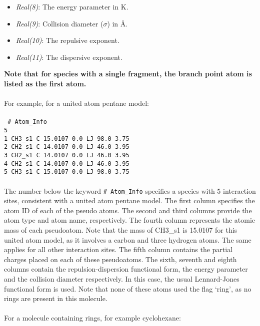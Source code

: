 \begin{itemize} 
\item {\it Real(8)}: The energy parameter in K.
%
\item {\it Real(9)}: Collision diameter ($\sigma$)  in \AA.
%
\item {\it Real(10)}: The repulsive exponent.
%
\item {\it Real(11)}: The dispersive exponent.
\end{itemize} 
%
%
{\bf Note that for species with a single fragment, the branch point atom
 is listed as the first atom.} \\ \\
%
For example, for a united atom pentane model: \\ \\
%
\texttt{
\# Atom\_Info\\
5\\
1    CH3\_s1    C    15.0107    0.0    LJ    98.0    3.75\\
2    CH2\_s1    C    14.0107    0.0    LJ    46.0    3.95\\
3    CH2\_s1    C    14.0107    0.0    LJ    46.0    3.95\\
4    CH2\_s1    C    14.0107    0.0    LJ    46.0    3.95\\
5    CH3\_s1    C    15.0107    0.0    LJ    98.0    3.75\\
} \\ 
%
The number below the keyword \texttt{\# Atom\_Info} specifies a species with 5 interaction sites, consistent with a united atom pentane model. 
The first column specifies the atom ID of each of the pseudo atoms.
The second and third columns provide the atom type and atom name, respectively.
The fourth column represents the atomic mass of each pseudoatom. Note that the mass of
CH3\_s1 is 15.0107 for this united atom model, as it involves a carbon and three hydrogen atoms. 
The same applies for all other interaction sites.
The fifth column contains the partial charges placed on each of these pseudoatoms.
The sixth, seventh and eighth columns contain the repulsion-dispersion functional form, 
the energy parameter and the collision diameter respectively. 
In this case, the usual Lennard-Jones functional form is used. 
Note that none of these atoms used the flag `ring', as no rings
are present in this molecule. \\ \\
%
For a molecule containing rings, for example cyclohexane: \\ \\
